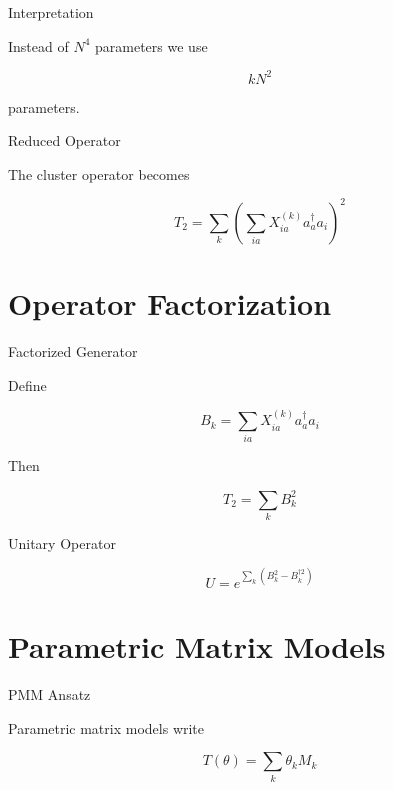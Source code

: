 \documentclass{beamer}
\begin{document}
\begin{frame}{Interpretation}

  Instead of $N^4$ parameters we use

  \[
  kN^2
  \]

  parameters.

\end{frame}

\begin{frame}{Reduced Operator}

  The cluster operator becomes

  \[
  T_2 =
  \sum_k
  \left(
  \sum_{ia} X_{ia}^{(k)} a_a^\dagger a_i
  \right)^2
  \]

\end{frame}

\section{Operator Factorization}

\begin{frame}{Factorized Generator}

  Define

  \[
  B_k =
  \sum_{ia}
  X_{ia}^{(k)} a_a^\dagger a_i
  \]

  Then

  \[
  T_2 =
  \sum_k B_k^2
  \]

\end{frame}

\begin{frame}{Unitary Operator}

  \[
  U =
  e^{\sum_k (B_k^2-B_k^{\dagger 2})}
  \]

\end{frame}

\section{Parametric Matrix Models}

\begin{frame}{PMM Ansatz}

  Parametric matrix models write

  \[
  T(\theta)=
  \sum_k \theta_k M_k
  \]

\end{frame}
\end{document}
